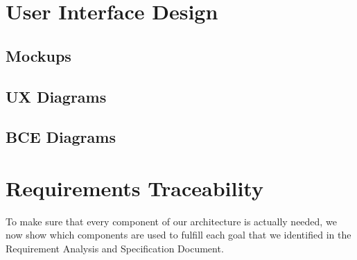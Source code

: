 \documentclass[english]{article}
\begin{document}
\begin{itemize}
\newpage

\section{User Interface Design}

\subsection{Mockups}

\subsection{UX Diagrams}

\subsection{BCE Diagrams}

\newpage

\section{Requirements Traceability}
To make sure that every component of our architecture is actually needed, we now show which components are used to fulfill each goal that we identified in the Requirement Analysis and Specification Document.


\end{itemize}
\end{document}
